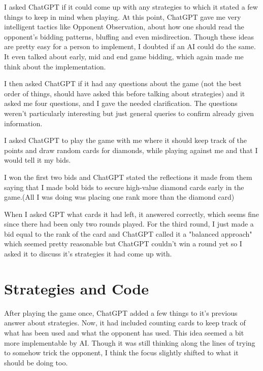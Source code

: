 \documentclass{article}
\begin{document}
I asked ChatGPT if it could come up with any strategies to which it stated a few things to keep in mind when playing. At this point, ChatGPT gave me very intelligent tactics like Opponent Observation, about how one should read the opponent's bidding patterns, bluffing and even misdirection. Though these ideas are pretty easy for a person to implement, I doubted if an AI could do the same. It even talked about early, mid and end game bidding, which again made me think about the implementation. \newline

I then asked ChatGPT if it had any questions about the game (not the best order of things, should have asked this before talking about strategies) and it asked me four questions, and I gave the needed clarification. The questions weren't particularly interesting but just general queries to confirm already given information. \newline

I asked ChatGPT to play the game with me where it should keep track of the points and draw random cards for diamonds, while playing against me and that I would tell it my bids. \newline

I won the first two bids and ChatGPT stated the reflections it made from them saying that I made bold bids to secure high-value diamond cards early in the game.(All I was doing was placing one rank more than the diamond card) \newline

When I asked GPT what cards it had left, it answered correctly, which seems fine since there had been only two rounds played. For the third round, I just made a bid equal to the rank of the card and ChatGPT called it a "balanced approach" which seemed pretty reasonable but ChatGPT couldn't win a round yet so I asked it to discuss it's strategies it had come up with. \newline

\section{Strategies and Code}
After playing the game once, ChatGPT added a few things to it's previous answer about strategies. Now, it had included counting cards to keep track of what has been used and what the opponent has used. This idea seemed a bit more implementable by AI. Though it was still thinking along the lines of trying to somehow trick the opponent, I think the focus slightly shifted to what it should be doing too. \newline
\end{document}
